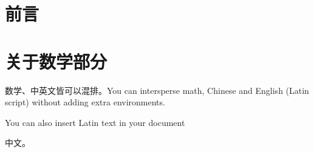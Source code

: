 \documentclass{article}
\begin{document}
\begin{CJK}{UTF8}{gbsn}

\section{前言}

\section{关于数学部分}
数学、中英文皆可以混排。You can intersperse math, Chinese and English (Latin script) without adding extra environments.

\end{CJK}

\bigskip  %

You can also insert Latin text in your document

\bigskip  %

\begin{CJK}{UTF8}{bsmi}
中文。
\end{CJK}
\end{document}
